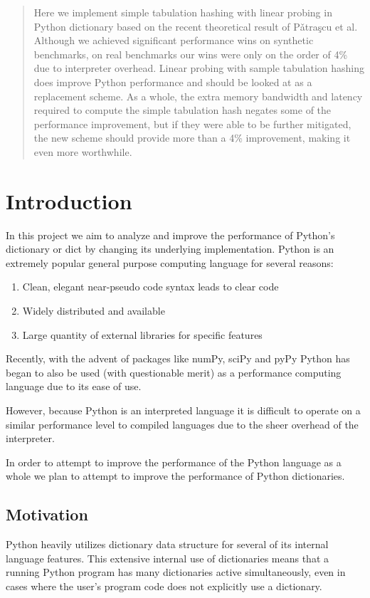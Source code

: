 \documentclass[11pt]{article}
\begin{document}
\maketitle

\begin{abstract}
Here we implement simple tabulation hashing with linear probing in Python
dictionary based on the recent theoretical result of P\v{a}tra\c{s}cu et al. Although
we achieved significant performance wins on synthetic benchmarks, on real
benchmarks our wins were only on the order of 4\% due to interpreter overhead.
Linear probing with sample tabulation hashing does improve Python performance
and should be looked at as a replacement scheme.  As a whole, the
extra memory bandwidth
and latency required to compute the simple tabulation hash negates some of the
performance improvement, but if they were able to be further mitigated, the new scheme
should provide more than a 4\% improvement, making it even more worthwhile.
\end{abstract}


\section{Introduction}
In this project we aim to analyze and improve the performance of Python's
dictionary or dict by changing its underlying implementation.  Python is an extremely popular general purpose computing language for several reasons:
\begin{enumerate}
 \item Clean, elegant near-pseudo code syntax leads to clear code 
 \item Widely distributed and available
 \item Large quantity of external libraries for specific features 
\end{enumerate}

Recently, with the advent of packages like numPy, sciPy and pyPy Python has began to also be used (with questionable merit) as a performance computing language due to its ease of use.

However, because Python is an interpreted language it is difficult to operate on a similar performance level to compiled languages due to the sheer overhead of the interpreter.

In order to attempt to improve the performance of the Python language as a whole we plan to attempt to improve the performance of Python dictionaries.

\subsection{Motivation}
Python heavily utilizes dictionary data structure for several of its internal language features. This extensive internal use of dictionaries means that a running Python program has many dictionaries active simultaneously, even in cases where the user's program code does not explicitly use a dictionary. 
\end{document}
